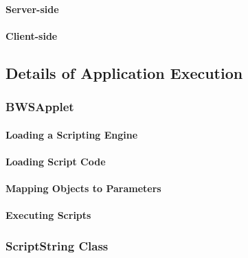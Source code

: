     \paragraph{Server-side}
    \paragraph{Client-side}
   \subsection{Details of Application Execution}
   
    
    
    \subsubsection{BWSApplet}

     
     
     \paragraph{Loading a Scripting Engine}
     
      
     
     \paragraph{Loading Script Code}
    
      
    
     \paragraph{Mapping Objects to Parameters}
      \label{sec:mapParamObject}
     
      
     
     \paragraph{Executing Scripts}

		  

    \subsubsection{ScriptString Class}
    \label{sec:scriptString}
     
     
